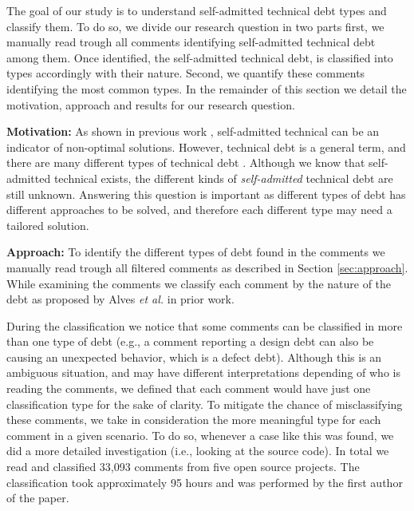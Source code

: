 The goal of our study is to understand self-admitted technical debt types and classify them. To do so, we divide our research question in two parts first, we manually read trough all comments identifying self-admitted technical debt among them. Once identified, the self-admitted technical debt, is classified into types accordingly with their nature. Second, we quantify these comments identifying the most common types. In the remainder of this section we detail the motivation, approach and results for our research question. 

\vspace{3mm}
\noindent\rqi
\vspace{3mm}

\noindent\textbf{Motivation:} As shown in previous work \cite{Potdar2014ICSME}, self-admitted technical can be an indicator of non-optimal solutions. However, technical debt is a general term, and there are many different types of technical debt \cite{Alves2014MTD}. Although we know that self-admitted technical exists, the different kinds of \textit{self-admitted} technical debt are still unknown. Answering this question is important as different types of debt has different approaches to be solved, and therefore each different type may need a tailored solution. 

\vspace{1mm}
\noindent\textbf{Approach:} To identify the different types of debt found in the comments we manually read trough all filtered comments as described in Section \ref{sec:approach}. While examining the comments we classify each comment by the nature of the debt as proposed by Alves \textit{et al.} in prior work. 

During the classification we notice that some comments can be classified in more than one type of debt (e.g., a comment reporting a design debt can also be causing an unexpected behavior, which is a defect debt). Although this is an ambiguous situation, and may have different interpretations depending of who is reading the comments, we defined that each comment would have just one classification type for the sake of clarity. To mitigate the chance of misclassifying these comments, we take in consideration the more meaningful type for each comment in a given scenario. To do so, whenever a case like this was found, we did a more detailed investigation (i.e., looking at the source code). In total we read and classified 33,093 comments from five open source projects. The classification took approximately 95 hours and was performed by the first author of the paper. 

